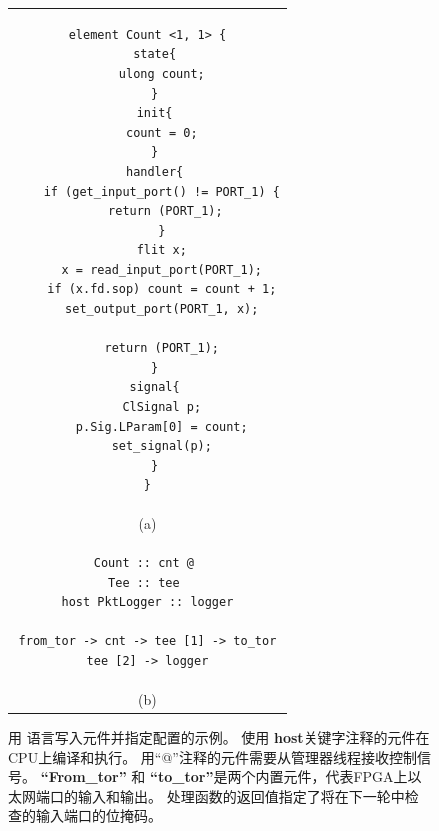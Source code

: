 \begin{figure}[htbp]
\small \lstset{style=numbers}

\centering
\begin{tabular}{c}
\small
\begin{lstlisting}
element Count <1, 1> {
  state{
    ulong count;
  }
  init{
    count = 0;
  }
  handler{
    if (get_input_port() != PORT_1) {
      return (PORT_1); 
    }
    flit x;
    x = read_input_port(PORT_1);
    if (x.fd.sop) count = count + 1;
    set_output_port(PORT_1, x);
   
    return (PORT_1);
  }
  signal{
    ClSignal p;
    p.Sig.LParam[0] = count;
    set_signal(p);
  }
}
\end{lstlisting} \vspace{3pt} \\
{\normalsize \centering (a)} \vspace{3pt} \\
\begin{lstlisting}
Count :: cnt @ 
Tee :: tee 
host PktLogger :: logger

from_tor -> cnt -> tee [1] -> to_tor
tee [2] -> logger
\end{lstlisting} \vspace{3pt} \\
{\normalsize \centering (b)} 
\end{tabular}
\caption{用 \name 语言写入元件并指定配置的示例。 使用 \textbf {host}关键字注释的元件在CPU上编译和执行。 用“@”注释的元件需要从管理器线程接收控制信号。
	\textbf {``From\_tor''} 和 \textbf {``to\_tor''}是两个内置元件，代表FPGA上以太网端口的输入和输出。 处理函数的返回值指定了将在下一轮中检查的输入端口的位掩码。}
\label{clicknp:fig:lang}

\end{figure}

